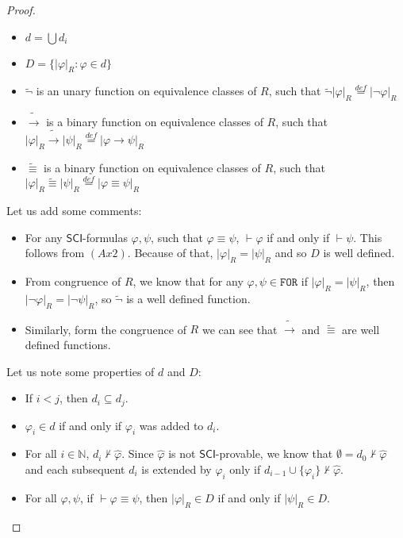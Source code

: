 \documentclass{article}
\theoremstyle{definition}
\theoremstyle{definition}
\theoremstyle{definition}
\newcommand*{\id}{\equiv}
\newcommand*{\ra}{\rightarrow}
\newcommand*{\FOR}{\texttt{FOR}}
\newcommand{\SCI}{$\mathsf{SCI}$\xspace}
\newcommand{\N}{\mathbb{N}}
\begin{document}
\begin{proof}
\begin{itemize}
        \item $d = \bigcup d_i$
        \item $D = \{ |\varphi|_R : \varphi \in d\}$
        \item $\tilde{\lnot}$ is an unary function on equivalence classes of $R$, such that $\tilde{\lnot}|\varphi|_R \stackrel{def}{=} |\lnot \varphi|_R$
        \item $\tilde{\ra}$ is a binary function on equivalence classes of $R$, such that $|\varphi|_R \tilde{\ra} |\psi|_R \stackrel{def}{=} |\varphi \ra \psi|_R$
        \item $\tilde{\id}$ is a binary function on equivalence classes of $R$, such that $|\varphi|_R \tilde{\id} |\psi|_R \stackrel{def}{=} |\varphi \id \psi|_R$
    \end{itemize}
    Let us add some comments:
    \begin{itemize}
        \item For any \SCI-formulas $\varphi, \psi$, such that $\varphi \id \psi$, $\vdash
                  \varphi$ if and only if $\vdash \psi$. This follows from $(Ax2)$. Because of
              that, $|\varphi|_R = |\psi|_R$ and so $D$ is well defined.
        \item From congruence of $R$, we know that for any $\varphi, \psi \in \FOR$ if
              $|\varphi|_R = |\psi|_R$, then $|\lnot \varphi|_R = |\lnot \psi|_R$, so
              $\tilde{\lnot}$ is a well defined function.
        \item Similarly, form the congruence of $R$ we can see that $\tilde{\ra}$ and
              $\tilde{\id}$ are well defined functions.
    \end{itemize}
    Let us note some properties of $d$ and $D$:
    \begin{itemize}
        \item If $i < j$, then $d_i \subseteq d_j$.
        \item $\varphi_i \in d$ if and only if $\varphi_i$ was added to $d_i$.
        \item For all $i \in \N$, $d_i \not \vdash \hat{\varphi}$. Since $\hat{\varphi}$ is
              not \SCI-provable, we know that $\emptyset = d_0 \not \vdash \hat{\varphi}$ and
              each subsequent $d_i$ is extended by $\varphi_i$ only if $d_{i-1} \cup
                  \{\varphi_i\} \not \vdash \hat{\varphi}$.
        \item For all $\varphi, \psi$, if $\vdash \varphi \id \psi$, then $|\varphi|_R \in D$
              if and only if $|\psi|_R \in D$.
    \end{itemize}


\end{proof}
\end{document}
